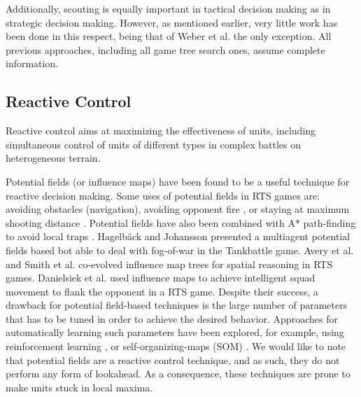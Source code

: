 \documentclass[journal]{IEEEtran}
\begin{document}

Additionally, scouting is equally important in tactical decision making as in strategic decision making. However, as mentioned earlier, very little work has been done in this respect, being that of Weber et al. \cite{WeberAIIDE11} the only exception. All previous approaches, including all game tree search ones, assume complete information.


\subsection{Reactive Control}

Reactive control %
aims at maximizing the effectiveness of units, including simultaneous control of units of different types in complex battles on heterogeneous terrain. 

Potential fields (or influence maps) have been found to be a useful technique for reactive decision making. Some uses of potential fields in RTS games are: avoiding obstacles (navigation), avoiding opponent fire \cite{uriarte2012kiting}, or staying at maximum shooting distance \cite{Hagelback09}. Potential fields have also been combined with A* path-finding to avoid local traps \cite{Hagelback12}. Hagelb\"{a}ck and Johansson \cite{HagelbackJ08} presented a multiagent potential fields based bot able to deal with fog-of-war in the Tankbattle game. Avery et al. \cite{Avery09} and Smith et al. \cite{SmithCIG10} co-evolved influence map trees for spatial reasoning in RTS games. Danielsiek et al. \cite{Danielsiek_2008} used influence maps to achieve intelligent squad movement to flank the opponent in a RTS game. Despite their success, a drawback for potential field-based techniques is the large number of parameters that has to be tuned in order to achieve the desired behavior. Approaches for automatically learning such parameters have been explored, for example, using reinforcement learning \cite{Liu_2008}, or self-organizing-maps (SOM) \cite{teamCompositionRTS}. We would like to note that potential fields are a reactive control technique, and as such, they do not perform any form of lookahead. As a consequence, these techniques are prone to make units stuck in local maxima. 
\end{document}
